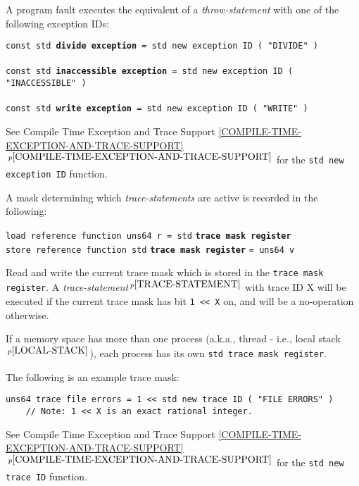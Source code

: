 \documentclass[12pt]{article}
\newcommand{\ttkey}[1]{{\tt \bfseries #1}}
\newcommand{\itemref}[1]{\ref{#1}$\,^{p\pageref{#1}}$}
\newcommand{\pagnote}[1]{$\,^{p\pageref{#1}}$}
\newenvironment{indpar}[1][0.3in]%
	{\begin{list}{}%
		     {\setlength{\itemsep}{0in}%
		      \setlength{\topsep}{0in}%
		      \setlength{\parsep}{1ex}%
		      \setlength{\labelwidth}{#1}%
		      \setlength{\leftmargin}{#1}%
		      \addtolength{\leftmargin}{\labelsep}}%
	 \item}%
	{\end{list}}
\begin{document}
A program fault executes the equivalent of a {\em throw-statement}
with one of the following exception IDs:

{\tt const std \ttkey{divide exception} = std new exception ID ( "DIVIDE" )} \\
\hspace*{1in}{\tt // Integer divide by zero.} \\
{\tt const std \ttkey{inaccessible exception} = std new exception ID ( "INACCESSIBLE" )} \\
\hspace*{1in}{\tt // Read or write of inaccessible memory location.}  \\
{\tt const std \ttkey{write exception} = std new exception ID ( "WRITE" )} \\
\hspace*{1in}{\tt // Write of accessible but write-protected
                  memory location.}

See Compile Time Exception and Trace Support
\itemref{COMPILE-TIME-EXCEPTION-AND-TRACE-SUPPORT}
for the {\tt std new exception ID} function.

A mask determining which {\em trace-statements} are active
is recorded in the following:

{\tt load reference function uns64 r = std} \ttkey{trace mask register}%
\label{CURRENT-TRACE-MASK} \\
{\tt store reference function std} \ttkey{trace mask register} {\tt = uns64 v}
\begin{indpar}
Read and write the current trace mask which is stored in the
{\tt trace mask register}.
A {\em trace-statement}\pagnote{TRACE-STATEMENT} with trace ID X
will be executed if the current trace mask has bit {\tt 1 <{}< X}
on, and will be a no-operation otherwise.
\end{indpar}

If a memory space has more than one process (a.k.a., thread - i.e., local
stack\pagnote{LOCAL-STACK}), each process has its own
{\tt std trace mask register}.

The following is an example trace mask:
\begin{indpar}\begin{verbatim}
uns64 trace file errors = 1 << std new trace ID ( "FILE ERRORS" )
    // Note: 1 << X is an exact rational integer.
\end{verbatim}\end{indpar}

See Compile Time Exception and Trace Support
\itemref{COMPILE-TIME-EXCEPTION-AND-TRACE-SUPPORT}
for the {\tt std new trace ID} function.
\end{document}
